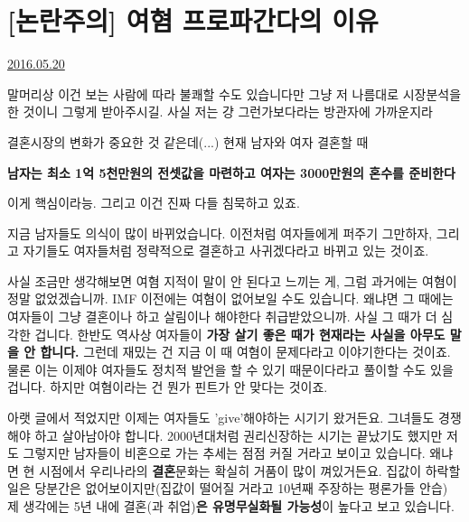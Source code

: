 \section{[논란주의] 여혐 프로파간다의 이유}
\href{https://www.kockoc.com/Apoc/784229}{2016.05.20}

\vspace{5mm}

말머리상 이건 보는 사람에 따라 불쾌할 수도 있습니다만
그냥 저 나름대로 시장분석을 한 것이니 그렇게 받아주시길. 사실 저는 걍 그런가보다라는 방관자에 가까운지라
\vspace{5mm}

결혼시장의 변화가 중요한 것 같은데(...)
현재 남자와 여자 결혼할 때
\vspace{5mm}

\textbf{남자는 최소 1억 5천만원의 전셋값을 마련하고 여자는 3000만원의 혼수를 준비한다}
\vspace{5mm}

이게 핵심이라능. 그리고 이건 진짜 다들 침묵하고 있죠.
\vspace{5mm}

지금 남자들도 의식이 많이 바뀌었습니다. 이전처럼 여자들에게 퍼주기 그만하자,
그리고 자기들도 여자들처럼 정략적으로 결혼하고 사귀겠다라고 바뀌고 있는 것이죠.
\vspace{5mm}

사실 조금만 생각해보면 여혐 지적이 말이 안 된다고 느끼는 게, 그럼 과거에는 여혐이 정말 없었겠습니까.
IMF 이전에는 여혐이 없어보일 수도 있습니다. 왜냐면 그 때에는 여자들이 그냥 결혼이나 하고 살림이나 해야한다 취급받았으니까.
사실 그 때가 더 심각한 겁니다. 한반도 역사상 여자들이 \textbf{가장 살기 좋은 때가 현재라는 사실을 아무도 말을 안 합니다.}
그런데 재밌는 건 지금 이 때 여혐이 문제다라고 이야기한다는 것이죠.
물론 이는 이제야 여자들도 정치적 발언을 할 수 있기 때문이다라고 풀이할 수도 있을 겁니다.
하지만 여혐이라는 건 뭔가 핀트가 안 맞다는 것이죠.
\vspace{5mm}

아랫 글에서 적었지만 이제는 여자들도 'give'해야하는 시기기 왔거든요.
그녀들도 경쟁해야 하고 살아남아야 합니다. 2000년대처럼 권리신장하는 시기는 끝났기도 했지만
저도 그렇지만 남자들이 비혼으로 가는 추세는 점점 커질 거라고 보이고 있습니다.
왜냐면 현 시점에서 우리나라의 \textbf{결혼}문화는 확실히 거품이 많이 껴있거든요.
집값이 하락할 일은 당분간은 없어보이지만(집값이 떨어질 거라고 10년째 주장하는 평론가들 안습)
제 생각에는 5년 내에 결혼(과 취업)\textbf{은 유명무실화될 가능성}이 높다고 보고 있습니다.
\vspace{5mm}

